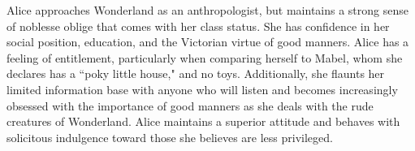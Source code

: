 \documentclass[letterpaper]{twentysecondcv} %
\begin{document}
Alice approaches Wonderland as an anthropologist, but maintains a strong sense of noblesse oblige that comes with her class status. She has confidence in her social position, education, and the Victorian virtue of good manners. Alice has a feeling of entitlement, particularly when comparing herself to Mabel, whom she declares has a ``poky little house," and no toys. Additionally, she flaunts her limited information base with anyone who will listen and becomes increasingly obsessed with the importance of good manners as she deals with the rude creatures of Wonderland. Alice maintains a superior attitude and behaves with solicitous indulgence toward those she believes are less privileged.

\end{document}
